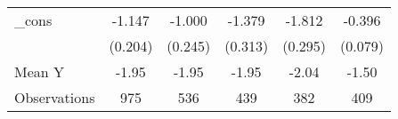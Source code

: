 {\begin{tabular}{l*{5}{c}}
\addlinespace
\_cons      &      -1.147\sym{***}&      -1.000\sym{***}&      -1.379\sym{***}&      -1.812\sym{***}&      -0.396\sym{***}\\
            &     (0.204)         &     (0.245)         &     (0.313)         &     (0.295)         &     (0.079)         \\
\midrule
Mean Y      &       -1.95         &       -1.95         &       -1.95         &       -2.04         &       -1.50         \\
Observations&         975         &         536         &         439         &         382         &         409         \\
\bottomrule
\end{tabular}
}

